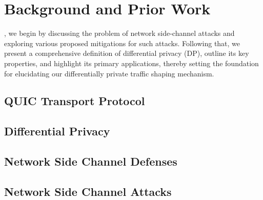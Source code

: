 \chapter{Background and Prior Work}
, we begin by discussing the problem of network side-channel attacks and exploring various proposed mitigations for such attacks. 
Following that, we present a comprehensive definition of differential privacy (DP), outline its key properties, and highlight its primary applications, thereby setting the foundation for elucidating our differentially private traffic shaping mechanism. 

\section{QUIC Transport Protocol}


\section{Differential Privacy}\label{sec:dp-background}


\section{Network Side Channel Defenses}\label{sec:ns-defenses}


\section{Network Side Channel Attacks}\label{sec:ns-attacks}




